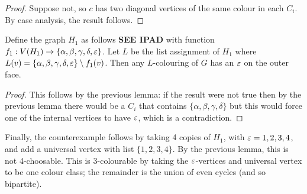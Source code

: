 \documentclass[main.tex]{subfiles}
\begin{document}
\begin{proof}
  Suppose not, so $c$ has two diagonal vertices of the same colour in each $C_i$.
  By case analysis, the result follows.
\end{proof}
\begin{lemma}
  Define the graph $H_1$ as follows
  \textbf{SEE IPAD}
  with function $f_1:V(H_1)\to\{\alpha,\beta,\gamma,\delta,\varepsilon\}$.
  Let $L$ be the list assignment of $H_1$ where
  $L(v) = \{\alpha,\beta,\gamma,\delta,\varepsilon\}\setminus f_1(v)$.
  Then any $L$-colouring of $G$ has an $\varepsilon$ on the outer face.
\end{lemma}
\begin{proof}
  This follows by the previous lemma: if the result were not true then by the
  previous lemma there would be a $C_i$ that contains
  $\{\alpha,\beta,\gamma,\delta\}$ but this would force one of the internal
  vertices to have $\varepsilon$, which is a contradiction.
\end{proof}
Finally, the counterexample follows by taking 4 copies of $H_1$,
with $\varepsilon = 1, 2, 3, 4$, and add a universal vertex with list $\{1,2,3,4\}$.
By the previous lemma, this is not 4-choosable.
This is 3-colourable by taking the $\varepsilon$-vertices and universal vertex to be
one colour class; the remainder is the union of even cycles (and so bipartite).
\end{document}
